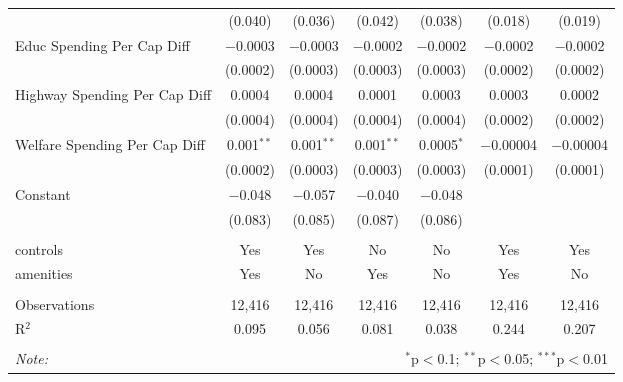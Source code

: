 \begin{table}[!htbp]
\begin{tabular}{@{\extracolsep{5pt}}lcccccc}
  & (0.040) & (0.036) & (0.042) & (0.038) & (0.018) & (0.019) \\ 
  Educ Spending Per Cap Diff & $-$0.0003 & $-$0.0003 & $-$0.0002 & $-$0.0002 & $-$0.0002 & $-$0.0002 \\ 
  & (0.0002) & (0.0003) & (0.0003) & (0.0003) & (0.0002) & (0.0002) \\ 
  Highway Spending Per Cap Diff & 0.0004 & 0.0004 & 0.0001 & 0.0003 & 0.0003 & 0.0002 \\ 
  & (0.0004) & (0.0004) & (0.0004) & (0.0004) & (0.0002) & (0.0002) \\ 
  Welfare Spending Per Cap Diff & 0.001$^{**}$ & 0.001$^{**}$ & 0.001$^{**}$ & 0.0005$^{*}$ & $-$0.00004 & $-$0.00004 \\ 
  & (0.0002) & (0.0003) & (0.0003) & (0.0003) & (0.0001) & (0.0001) \\ 
  Constant & $-$0.048 & $-$0.057 & $-$0.040 & $-$0.048 &  &  \\ 
  & (0.083) & (0.085) & (0.087) & (0.086) &  &  \\ 
 \hline \\[-1.8ex] 
controls & Yes & Yes & No & No & Yes & Yes \\ 
amenities & Yes & No & Yes & No & Yes & No \\ 
\hline \\[-1.8ex] 
Observations & 12,416 & 12,416 & 12,416 & 12,416 & 12,416 & 12,416 \\ 
R$^{2}$ & 0.095 & 0.056 & 0.081 & 0.038 & 0.244 & 0.207 \\ 
\hline 
\hline \\[-1.8ex] 
\textit{Note:}  & \multicolumn{6}{r}{$^{*}$p$<$0.1; $^{**}$p$<$0.05; $^{***}$p$<$0.01} \\ 
\end{tabular} 
\end{table} 
